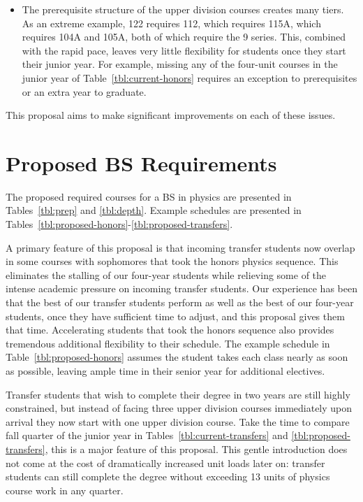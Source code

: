 \documentclass[12pt]{article}
\begin{document}
\begin{itemize}
\item The prerequisite structure of the upper division courses creates
  many tiers.  As an extreme example, 122 requires 112, which requires
  115A, which requires 104A and 105A, both of which require the 9
  series.  This, combined with the rapid pace, leaves very little
  flexibility for students once they start their junior year.  For
  example, missing any of the four-unit courses in the junior year of
  Table~\ref{tbl:current-honors} requires an exception to
  prerequisites or an extra year to graduate.
\end{itemize}
This proposal aims to make significant improvements on each of these issues.

\newpage

\section{Proposed BS Requirements}

The proposed required courses for a BS in physics are presented in
Tables~\ref{tbl:prep} and \ref{tbl:depth}.  Example schedules are
presented in
Tables~\ref{tbl:proposed-honors}-\ref{tbl:proposed-transfers}.

A primary feature of this proposal is that incoming transfer students
now overlap in some courses with sophomores that took the honors
physics sequence.  This eliminates the stalling of our four-year
students while relieving some of the intense academic pressure on
incoming transfer students.  Our experience has been that the best of
our transfer students perform as well as the best of our four-year
students, once they have sufficient time to adjust, and this proposal
gives them that time.  Accelerating students that took the honors
sequence also provides tremendous additional flexibility to their
schedule.  The example schedule in Table~\ref{tbl:proposed-honors}
assumes the student takes each class nearly as soon as possible,
leaving ample time in their senior year for additional electives.

Transfer students that wish to complete their degree in two years are
still highly constrained, but instead of facing three upper division
courses immediately upon arrival they now start with one upper
division course.  Take the time to compare fall quarter of the junior
year in Tables~\ref{tbl:current-transfers} and
\ref{tbl:proposed-transfers}, this is a major feature of this
proposal.  This gentle introduction does not come at the cost of
dramatically increased unit loads later on: transfer students can
still complete the degree without exceeding 13 units of physics
course work in any quarter.
\end{document}
